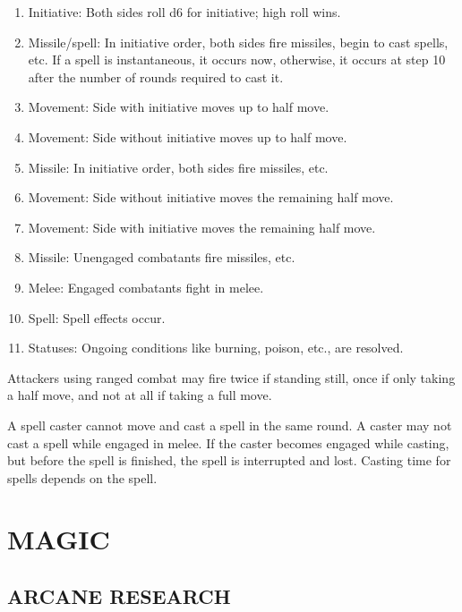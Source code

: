 \documentclass[twoside]{article}
\begin{document}
\begin{enumerate}[nosep]
\item Initiative: Both sides roll d6 for initiative; high roll wins.
\item Missile/spell: In initiative order, both sides fire missiles, begin to cast spells, etc. If a spell is instantaneous, it occurs now, otherwise, it occurs at step 10 after the number of rounds required to cast it.
\item Movement: Side with initiative moves up to half move.
\item Movement: Side without initiative moves up to half move.
\item Missile: In initiative order, both sides fire missiles, etc.
\item Movement: Side without initiative moves the remaining half move.
\item Movement: Side with initiative moves the remaining half move.
\item Missile: Unengaged combatants fire missiles, etc.
\item Melee: Engaged combatants fight in melee.
\item Spell: Spell effects occur.
\item Statuses: Ongoing conditions like burning, poison, etc., are resolved.
\end{enumerate}

\bigbreak

Attackers using ranged combat may fire twice if standing still, once if only taking a half move, and not at all if taking a full move.

\bigbreak

A spell caster cannot move and cast a spell in the same round. A caster may not cast a spell while engaged in melee. If the caster becomes engaged while casting, but before the spell is finished, the spell is interrupted and lost. Casting time for spells depends on the spell.

\section*{MAGIC}

\subsection*{\footnotesize{A}\scriptsize{RCANE} \footnotesize{R}\scriptsize{ESEARCH}\normalsize}
\end{document}
